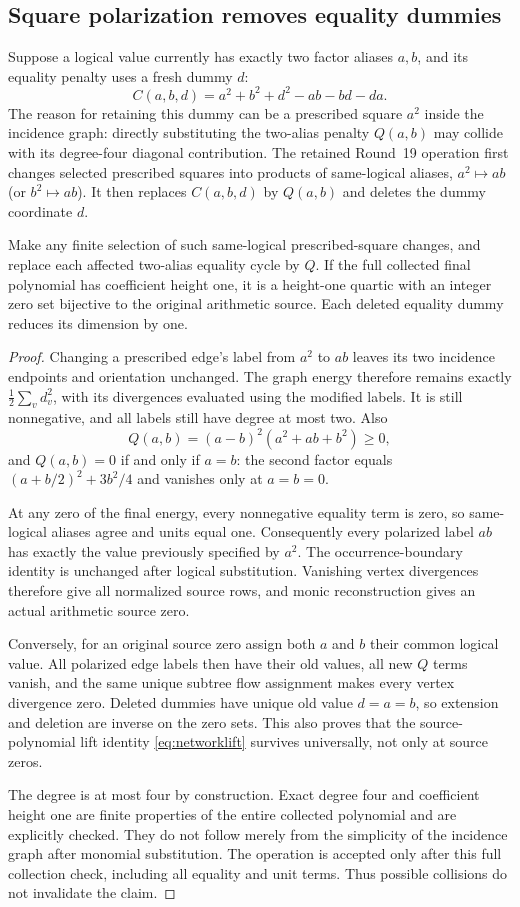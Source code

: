 \subsection{Square polarization removes equality dummies}
Suppose a logical value currently has exactly two factor aliases $a,b$,
and its equality penalty uses a fresh dummy $d$:
\[
 C(a,b,d)=a^2+b^2+d^2-ab-bd-da.
\]
The reason for retaining this dummy can be a prescribed square $a^2$
inside the incidence graph: directly substituting the two-alias penalty
$Q(a,b)$ may collide with its degree-four diagonal contribution. The retained Round~19
operation first changes selected prescribed squares into products of
same-logical aliases, $a^2\mapsto ab$ (or $b^2\mapsto ab$). It then replaces
$C(a,b,d)$ by $Q(a,b)$ and deletes the dummy coordinate $d$.

\begin{theorem}\label{thm:polarization}
Make any finite selection of such same-logical prescribed-square changes,
and replace each affected two-alias equality cycle by $Q$. If the full
collected final polynomial has coefficient height one, it is a height-one
quartic with an integer zero set bijective to the original arithmetic
source. Each deleted equality dummy reduces its dimension by one.
\end{theorem}
\begin{proof}
Changing a prescribed edge's label from $a^2$ to $ab$ leaves its two
incidence endpoints and orientation unchanged. The graph energy therefore
remains exactly $\frac12\sum_v d_v^2$, with its divergences evaluated using
the modified labels. It is still nonnegative, and all labels still have
degree at most two. Also
\[
 Q(a,b)=(a-b)^2(a^2+ab+b^2)\ge0,
\]
and $Q(a,b)=0$ if and only if $a=b$: the second factor equals
$(a+b/2)^2+3b^2/4$ and vanishes only at $a=b=0$.

At any zero of the final energy, every nonnegative equality term is zero,
so same-logical aliases agree and units equal one. Consequently every
polarized label $ab$ has exactly the value previously specified by $a^2$.
The occurrence-boundary identity is unchanged after logical substitution.
Vanishing vertex divergences therefore give all normalized source rows,
and monic reconstruction gives an actual arithmetic source zero.

Conversely, for an original source zero assign both $a$ and $b$ their
common logical value. All polarized edge labels then have their old values,
all new $Q$ terms vanish, and the same unique subtree flow assignment makes
every vertex divergence zero. Deleted dummies have unique old value $d=a=b$,
so extension and deletion are inverse on the zero sets. This also proves
that the source-polynomial lift identity \eqref{eq:networklift} survives
universally, not only at source zeros.

The degree is at most four by construction. Exact degree four and
coefficient height one are finite properties of the entire collected
polynomial and are explicitly checked. They do not follow merely from the
simplicity of the incidence graph after monomial substitution. The operation
is accepted only after this full collection check, including all equality
and unit terms. Thus possible collisions do not invalidate the claim.
\end{proof}
